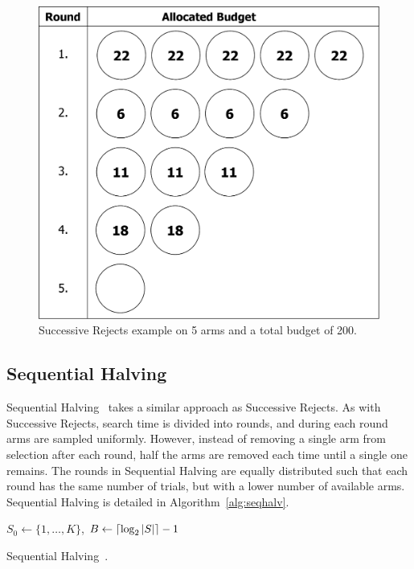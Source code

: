 \documentclass{kecsmstr}
\DeclarePairedDelimiter{\ceil}{\lceil}{\rceil}
\DeclarePairedDelimiter{\floor}{\lfloor}{\rfloor}
\begin{document}
\begin{figure}[ht]
	\centering
	\includegraphics[width=.5\textwidth]{img/succ_rej.png}
	\caption{Successive Rejects example on 5 arms and a total budget of 200.}
	\label{fig:succ-rej}
\end{figure}

\newpage

\subsection{Sequential Halving}
Sequential Halving~ takes a similar approach as Successive Rejects. As with Successive Rejects, search time is divided into rounds, and during each round arms are sampled uniformly. However, instead of removing a single arm from selection after each round, half the arms are removed each time until a single one remains. The rounds in Sequential Halving are equally distributed such that each round has the same number of trials, but with a lower number of available arms. Sequential Halving is detailed in Algorithm~\ref{alg:seqhalv}.

\IncMargin{1em}
\begin{algorithm2e}[ht]
	\vspace{0.2cm}
	$S_0 \gets \{1,\dots,K\}$,
	$B \gets \ceil{\log_2{|S|}} - 1$														\;
	\BlankLine
	\BlankLine
  \caption[Sequential Halving]{Sequential Halving~\protect{}. \label{alg:seqhalv}}
\end{algorithm2e}
\DecMargin{1em}
\end{document}
